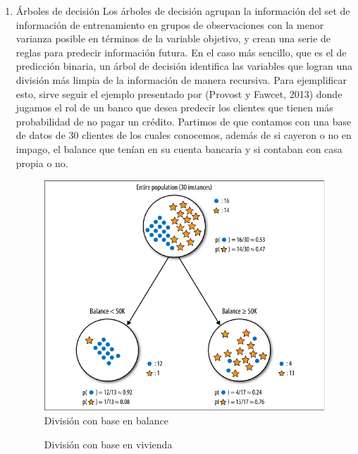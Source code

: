 \documentclass[a4paper, 11pt]{article}
\begin{document}
\begin{enumerate}
\item Árboles de decisión
Los árboles de decisión agrupan la información del set de información de entrenamiento en grupos de observaciones con la menor varianza posible en términos de la variable objetivo, y crean una serie de reglas para predecir información futura. En el caso más sencillo, que es el de predicción binaria, un árbol de decisión identifica las variables que logran una división más limpia de la información de manera recursiva. Para ejemplificar esto, sirve seguir el ejemplo presentado por (Provost y Fawcet, 2013) donde jugamos el rol de un banco que desea predecir los clientes que tienen más probabilidad de no pagar un crédito. Partimos de que contamos con una base de datos de 30 clientes de los cuales conocemos, además de si cayeron o no en impago, el balance que tenían en su cuenta bancaria y si contaban con casa propia o no. 
\begin{figure}[hbt!]
    \centering
     \caption{División con base en balance}
     \label{fig:dt_1}
     \includegraphics[scale = 0.6]{figures/dt_1}
\end{figure}
\begin{figure}[hbt!]
    \centering
     \caption{División con base en vivienda}
     \label{fig:dt_2}

\end{figure}
\end{enumerate}
\end{document}
